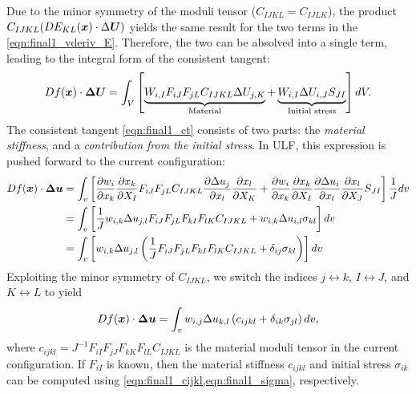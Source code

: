 Due to the minor symmetry of the moduli tensor ($C_{IJKL} = C_{IJLK}$), the product $C_{IJKL} (DE_{KL}(\bm{x})\cdot \Delta \bm{U})$ yields the same result for the two terms in the \cref{eqn:final1_vderiv_E}. 
Therefore, the two can be absolved into a single term, leading to the integral form of the consistent tangent:
\begin{equation}\label{eqn:final1_ct}
    Df(\bm{x}) \cdot \bm{\Delta \bm{U}} = \int_V \left[ \underbrace{W_{i,I} F_{iJ} F_{jL} C_{IJKL} \Delta U_{j,K}}_{\textrm{Material}} + \underbrace{W_{i,I} \Delta U_{i,J} S_{JI}}_{\textrm{Initial stress}}\right] dV.
\end{equation}
The consistent tangent \cref{eqn:final1_ct} consists of two parts: the \emph{material stiffness}, and a \emph{contribution from the initial stress}.
In ULF, this expression is pushed forward to the current configuration:
\begin{equation}
\begin{aligned}
    Df(\bm{x}) \cdot \bm{\Delta \bm{u}} &= \int_v \left[ \frac{\partial w_i}{\partial x_k} \frac{\partial x_k}{\partial X_I} F_{iJ} F_{jL} C_{IJKL} \frac{\partial \Delta u_j}{\partial x_l} \frac{\partial x_l}{\partial X_K} + \frac{\partial w_i}{\partial x_k} \frac{\partial x_k}{\partial X_I} \frac{\partial \Delta u_i}{\partial x_l} \frac{\partial x_l}{\partial X_J} S_{JI}\right] \frac{1}{J}dv \\
    &= \int_v \left[ \frac{1}{J}w_{i,k} \Delta u_{j,l} F_{iJ} F_{jL} F_{kI} F_{lK} C_{IJKL} + w_{i,k} \Delta u_{i,l} \sigma_{kl} \right] dv \\
    &= \int_v \left[ w_{i,k} \Delta u_{j,l} \left( \frac{1}{J} F_{iJ} F_{jL} F_{kI} F_{lK} C_{IJKL} + \delta_{ij} \sigma_{kl} \right) \right] dv
\end{aligned}
\end{equation}
Exploiting the minor symmetry of $C_{IJKL}$, we switch the indices $j \leftrightarrow k$, $I \leftrightarrow J$, and $K \leftrightarrow L$ to yield 
\begin{equation}\label{eqn:final1_ct_curr}
    Df(\bm{x}) \cdot \bm{\Delta \bm{u}} = \int_v w_{i,j} \Delta u_{k,l} \left( c_{ijkl} + \delta_{ik} \sigma_{jl} \right) dv,
\end{equation}
where $c_{ijkl} = J^{-1} F_{iI} F_{jJ} F_{kK} F_{lL} C_{IJKL}$ is the material moduli tensor in the current configuration.
If $F_{iI}$ is known, then the material stiffness $c_{ijkl}$ and initial stress $\sigma_{ik}$ can be computed using \cref{eqn:final1_cijkl,eqn:final1_sigma}, respectively. 

